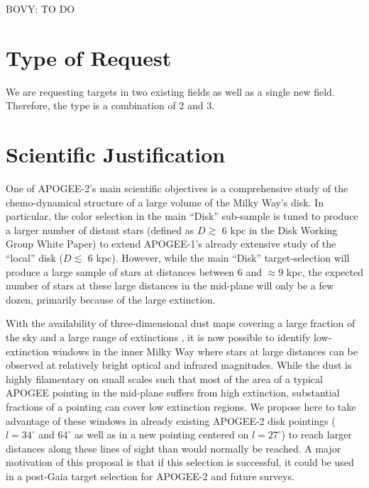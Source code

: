 \documentclass[12pt,preprint]{aastex}
\newcommand{\eg}{e.g.}
\begin{document}
BOVY: TO DO

\section{Type of Request}

We are requesting targets in two existing fields as well as a single
new field. Therefore, the type is a combination of 2 and 3.
\newpage

\section{Scientific Justification}

One of APOGEE-2's main scientific objectives is a comprehensive study
of the chemo-dynamical structure of a large volume of the Milky Way's
disk. In particular, the color selection in the main ``Disk''
sub-sample is tuned to produce a larger number of distant stars
(defined as $D\gtrsim$ 6 kpc in the Disk Working Group White Paper) to
extend APOGEE-1's already extensive study of the ``local'' disk ($D
\lesssim$ 6 kpc). However, while the main ``Disk'' target-selection
will produce a large sample of stars at distances between 6 and
$\approx9$ kpc, the expected number of stars at these large distances
in the mid-plane will only be a few dozen, primarily because of the
large extinction.

With the availability of three-dimensional dust maps covering a large
fraction of the sky and a large range of extinctions
\citep[\eg,][]{Marshall06a,Green15a}, it is now possible to identify
low-extinction windows in the inner Milky Way where stars at large
distances can be observed at relatively bright optical and infrared
magnitudes. While the dust is highly filamentary on small scales such
that most of the area of a typical APOGEE pointing in the mid-plane
suffers from high extinction, substantial fractions of a pointing can
cover low extinction regions. We propose here to take advantage of
these windows in already existing APOGEE-2 disk pointings
($l=34^\circ$ and $64^\circ$ as well as in a new pointing centered on
$l=27^\circ$) to reach larger distances along these lines of sight than
would normally be reached. A major motivation of this proposal is that
if this selection is successful, it could be used in a post-Gaia
target selection for APOGEE-2 and future surveys.
\end{document}
